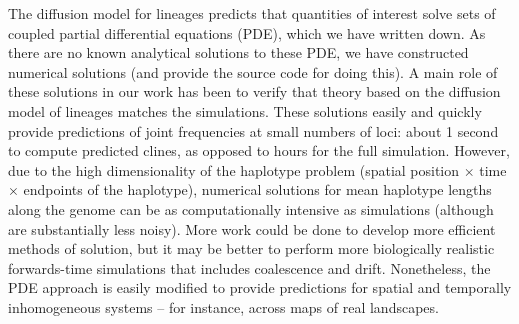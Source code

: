 \documentclass[11pt,letterpaper]{article}
\newcommand{\alisa}[1]{{\em \color{red} #1}}
\newcommand{\plr}[1]{{\em \color{blue} #1}}
\newcommand{\yb}[1]{{\em \color{magenta} #1}}
\begin{document}
The diffusion model for lineages predicts that quantities of interest solve sets of coupled partial differential equations (PDE),
which we have written down.
As there are no known analytical solutions to these PDE,
we have constructed numerical solutions (and provide the source code for doing this).
A main role of these solutions in our work has been to verify that theory based on the diffusion model of lineages
matches the simulations.
These solutions easily and quickly provide predictions of joint frequencies at small numbers of loci:
about 1 second to compute predicted clines, as opposed to hours for the full simulation.
However, due to the high dimensionality of the haplotype problem (spatial position $\times$ time $\times$ endpoints of the haplotype),
numerical solutions for mean haplotype lengths along the genome can be as computationally intensive as simulations
(although are substantially less noisy).
More work could be done to develop more efficient methods of solution,
but it may be better to perform more biologically realistic forwards-time simulations that includes coalescence and drift.
Nonetheless, the PDE approach is easily modified to provide predictions for spatial and temporally inhomogeneous systems --
for instance, across maps of real landscapes.


\end{document}
